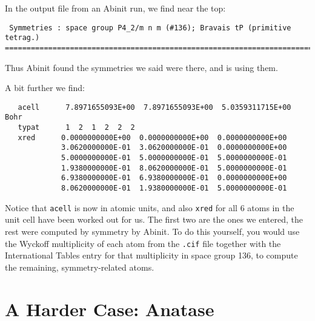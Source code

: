 \documentclass{article}
\begin{document}
In the output file from an {\sc Abinit} run, we find near the top:
\begin{verbatim}
 Symmetries : space group P4_2/m n m (#136); Bravais tP (primitive tetrag.)
================================================================================
\end{verbatim}
Thus {\sc Abinit} found the symmetries we said were there, and is using them.

A bit further we find:
\begin{verbatim}
   acell      7.8971655093E+00  7.8971655093E+00  5.0359311715E+00 Bohr
   typat      1  2  1  2  2  2
   xred      0.0000000000E+00  0.0000000000E+00  0.0000000000E+00
             3.0620000000E-01  3.0620000000E-01  0.0000000000E+00
             5.0000000000E-01  5.0000000000E-01  5.0000000000E-01
             1.9380000000E-01  8.0620000000E-01  5.0000000000E-01
             6.9380000000E-01  6.9380000000E-01  0.0000000000E+00
             8.0620000000E-01  1.9380000000E-01  5.0000000000E-01
\end{verbatim}
Notice that {\tt acell} is now in atomic units, and also {\tt xred} for all 6 atoms in the
unit cell have been worked out for us. The first two are the ones we entered, the rest were
computed by symmetry by {\sc Abinit}. To do this yourself, you would use the Wyckoff multiplicity
of each atom from the {\tt .cif} file together with the International Tables entry for that
multiplicity in space group 136, to compute the remaining, symmetry-related atoms.

\section{A Harder Case: Anatase}
\end{document}
